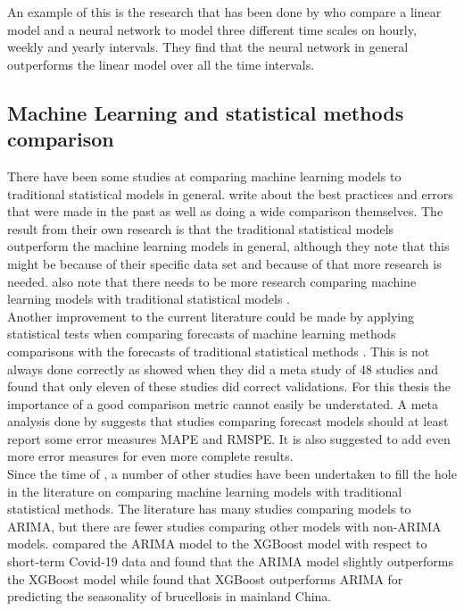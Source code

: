 
An example of this is the research that has been done by \cite{Ringwood2001ForecastingNetworks}  who compare a linear model and a neural network to model three different time scales on hourly, weekly and yearly intervals. They find that the neural network in general outperforms the linear model over all the time intervals.\\

\subsection{Machine Learning and statistical methods comparison}
There have been some studies at comparing machine learning models to traditional statistical models in general. \cite{Makridakis2018StatisticalForward} write about the best practices and errors that were made in the past as well as doing a wide comparison themselves. The result from their own research is that the traditional statistical models outperform the machine learning models in general, although they note that this might be because of their specific data set and because of that more research is needed. \cite{Makridakis2018StatisticalForward} also note that there needs to be more research comparing machine learning models with traditional statistical models \citep{Chatfield1993NeuralFad}.\\

Another improvement to the current literature could be made by applying statistical tests when comparing forecasts of machine learning methods comparisons with the forecasts of traditional statistical methods \citep{Masini2021MachineForecasting, Makridakis2018StatisticalForward}. This is not always done correctly as \cite{Adya1998HowEvaluation} showed when they did a meta study of 48 studies and found that only eleven of these studies did correct validations. For this thesis the importance of a good comparison metric cannot easily be understated. A meta analysis done by \cite{Peng2014APractice} suggests that studies comparing forecast models should at least report some error measures MAPE and RMSPE. It is also suggested to add even more error measures for even more complete results.\\

Since the time of \cite{Adya1998HowEvaluation}, a number of other studies have been undertaken to fill the hole in the literature on comparing machine learning models with traditional statistical methods. The literature has many studies comparing models to ARIMA, but there are fewer studies comparing other models with non-ARIMA models. \cite{Siddikur2022AccuracyBangladesh} compared the ARIMA model to the XGBoost model with respect to short-term Covid-19 data and found that the ARIMA model slightly outperforms the XGBoost model while \cite{Alim2020ComparisonStudy} found that XGBoost outperforms ARIMA for predicting the seasonality of brucellosis in mainland China.\\

